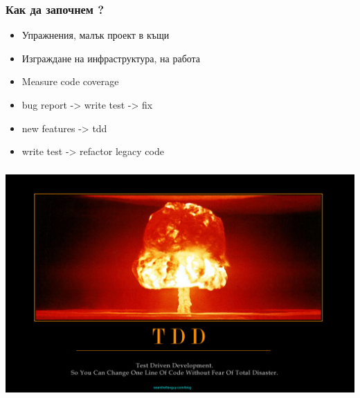 \begin{frame}
  \frametitle{Как да започнем ?}
  \begin{itemize}
      \item Упражнения, малък проект в къщи
      \item Изграждане на инфраструктура, на работа
      \item Measure code coverage
      \item bug report -> write test -> fix
      \item new features -> tdd
      \item write test -> refactor legacy code
  \end{itemize}
\end{frame}

\vspace*{-12.5mm}    
\begin{frame}
\frametitle{}
\hspace*{-11mm}
\includegraphics[width=\paperwidth, width=\paperwidth]{tdd.jpg}
\end{frame}


